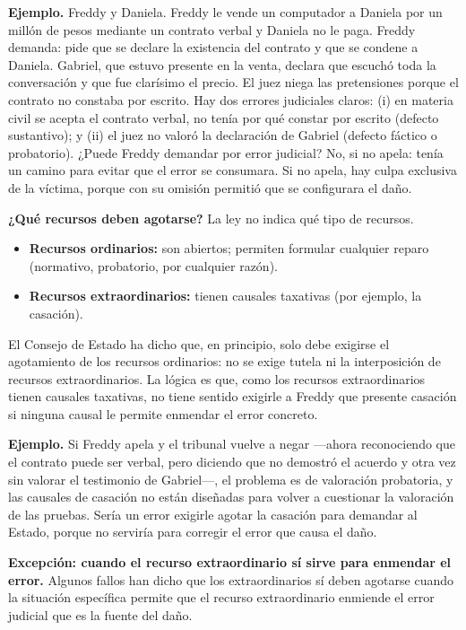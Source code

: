 \begin{ejemplo}
\textcolor[HTML]{4F6228}{\textbf{Ejemplo. }}Freddy y Daniela. Freddy le vende un computador a Daniela por un millón de pesos mediante un contrato verbal y Daniela no le paga. Freddy demanda: pide que se declare la existencia del contrato y que se condene a Daniela. Gabriel, que estuvo presente en la venta, declara que escuchó toda la conversación y que fue clarísimo el precio. El juez niega las pretensiones porque el contrato no constaba por escrito. Hay dos errores judiciales claros: (i) en materia civil se acepta el contrato verbal, no tenía por qué constar por escrito (defecto sustantivo); y (ii) el juez no valoró la declaración de Gabriel (defecto fáctico o probatorio). ¿Puede Freddy demandar por error judicial? No, si no apela: tenía un camino para evitar que el error se consumara. Si no apela, hay culpa exclusiva de la víctima, porque con su omisión permitió que se configurara el daño.
\end{ejemplo}
\textbf{¿Qué recursos deben agotarse?} La ley no indica qué tipo de recursos.

\begin{itemize}
\item \textbf{Recursos ordinarios:} son abiertos; permiten formular cualquier reparo (normativo, probatorio, por cualquier razón).
\item \textbf{Recursos extraordinarios:} tienen causales taxativas (por ejemplo, la casación).
\end{itemize}
El Consejo de Estado ha dicho que, en principio, solo debe exigirse el agotamiento de los recursos ordinarios: no se exige tutela ni la interposición de recursos extraordinarios. La lógica es que, como los recursos extraordinarios tienen causales taxativas, no tiene sentido exigirle a Freddy que presente casación si ninguna causal le permite enmendar el error concreto.

\begin{ejemplo}
\textcolor[HTML]{4F6228}{\textbf{Ejemplo. }}Si Freddy apela y el tribunal vuelve a negar —ahora reconociendo que el contrato puede ser verbal, pero diciendo que no demostró el acuerdo y otra vez sin valorar el testimonio de Gabriel—, el problema es de valoración probatoria, y las causales de casación no están diseñadas para volver a cuestionar la valoración de las pruebas. Sería un error exigirle agotar la casación para demandar al Estado, porque no serviría para corregir el error que causa el daño.
\end{ejemplo}
\textbf{Excepción: cuando el recurso extraordinario sí sirve para enmendar el error.} Algunos fallos han dicho que los extraordinarios sí deben agotarse cuando la situación específica permite que el recurso extraordinario enmiende el error judicial que es la fuente del daño.

